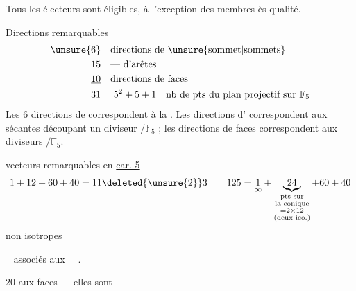 Tous les électeurs sont éligibles, à l'exception des membres ès qualité.

Directions remarquables
\[
\begin{aligned}
\unsure{6}&\quad\text{directions de \unsure{sommet|sommets}}\\
15&\quad\text{--- d'arêtes}\\
\underline{10}&\quad\text{directions de faces}\\
31&=5^2+5+1\quad\text{nb de pts du plan projectif sur }\mathbb F_5
\end{aligned}
\]
Les 6 directions de  correspondent à la . Les  directions d' correspondent aux sécantes découpant un diviseur \deleted{$\unsure{\to}$}$/\mathbb F_5$ ; les  directions de faces correspondent aux diviseurs  $/\mathbb F_5$.

vecteurs remarquables en \uline{car. 5}
\[
1+12+60+40=11\deleted{\unsure{2}}3
\qquad
125=\underset{\infty}{1}+\underbrace{24}_{\substack{\text{pts sur}\\\text{la conique}\\=2\times12\\\text{(deux ico.)}}}+60+40
\]
   non isotropes

\  associés aux \ \ .


20 aux faces --- elles sont 


